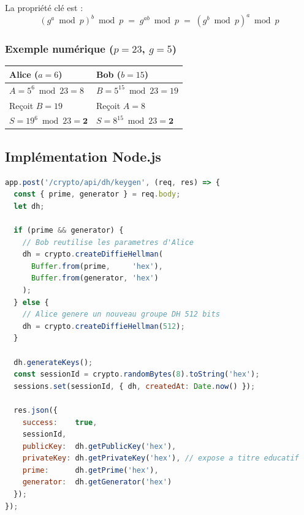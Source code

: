 \documentclass[12pt,a4paper]{report}
\begin{document}
La propriété clé est :
$$(g^a \bmod p)^b \bmod p \;=\; g^{ab} \bmod p \;=\; (g^b \bmod p)^a \bmod p$$

\subsubsection{Exemple numérique ($p=23$, $g=5$)}

\begin{center}
\begin{tabular}{L{6cm} L{6.5cm}}
  \toprule
  \textbf{Alice ($a = 6$)} & \textbf{Bob ($b = 15$)} \\
  \midrule
  $A = 5^6 \bmod 23 = 8$       & $B = 5^{15} \bmod 23 = 19$ \\[4pt]
  Reçoit $B = 19$              & Reçoit $A = 8$ \\[4pt]
  $S = 19^6 \bmod 23 = \mathbf{2}$ & $S = 8^{15} \bmod 23 = \mathbf{2}$ \\
  \bottomrule
\end{tabular}
\end{center}

\subsection{Implémentation Node.js}

\begin{lstlisting}[language=JavaScript, caption={Génération d'une paire de clés DH — routes.js}]
app.post('/crypto/api/dh/keygen', (req, res) => {
  const { prime, generator } = req.body;
  let dh;

  if (prime && generator) {
    // Bob reutilise les parametres d'Alice
    dh = crypto.createDiffieHellman(
      Buffer.from(prime,     'hex'),
      Buffer.from(generator, 'hex')
    );
  } else {
    // Alice genere un nouveau groupe DH 512 bits
    dh = crypto.createDiffieHellman(512);
  }

  dh.generateKeys();
  const sessionId = crypto.randomBytes(8).toString('hex');
  sessions.set(sessionId, { dh, createdAt: Date.now() });

  res.json({
    success:    true,
    sessionId,
    publicKey:  dh.getPublicKey('hex'),
    privateKey: dh.getPrivateKey('hex'), // expose a titre educatif
    prime:      dh.getPrime('hex'),
    generator:  dh.getGenerator('hex')
  });
});
\end{lstlisting}
\end{document}
